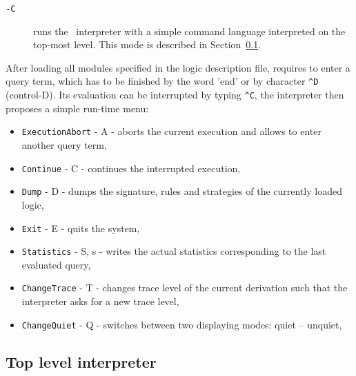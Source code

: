 \begin{description}
 \item[{\tt -C}]
   runs the \elan\ interpreter
   with a simple command language interpreted on the top-most level.
   This mode is described in Section~\ref{TopLevelInter}.

\end{description}

\noindent
After loading all modules specified in the logic description file, 
\elan{} requires to enter a query term, which
has to be finished by the word 'end' or by character \verb|^D| (control-D).
Its evaluation can be interrupted by typing \verb|^C|, 
the interpreter then proposes a simple run-time menu:
\begin{itemize}
  \item {\tt ExecutionAbort} - A -
    aborts the current execution and allows to enter another query term,
  \item {\tt Continue} - C -
    continues the interrupted execution,
  \item {\tt Dump} - D -
    dumps the signature, rules and strategies of the currently loaded
    logic,
  \item {\tt Exit} - E -
    quits the \elan{} system,
  \item {\tt Statistics} - S, s -
    writes the actual statistics corresponding to the last evaluated query,
  \item {\tt ChangeTrace} - T -
    changes trace level of the current derivation such that 
    the interpreter asks for a new trace level,
  \item {\tt ChangeQuiet} - Q -
    switches between two displaying modes: quiet -- unquiet,
\end{itemize}


\subsection{Top level interpreter} \label{TopLevelInter}


